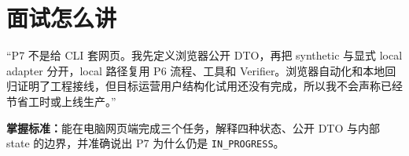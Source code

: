 \section{面试怎么讲}

\begin{interviewbox}
“P7 不是给 CLI 套网页。我先定义浏览器公开 DTO，再把 synthetic 与显式 local adapter 分开，local 路径复用 P6 流程、工具和 Verifier。浏览器自动化和本地回归证明了工程接线，但目标运营用户结构化试用还没有完成，所以我不会声称已经节省工时或上线生产。”
\end{interviewbox}

\textbf{掌握标准：}能在电脑网页端完成三个任务，解释四种状态、公开 DTO 与内部 state 的边界，并准确说出 P7 为什么仍是 \texttt{IN\_PROGRESS}。
